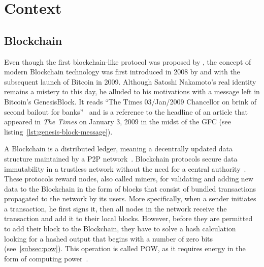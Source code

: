 \chapter{Context}\label{ch:context}

\section{Blockchain}\label{sec:blockchain}



Even though the first blockchain-like protocol was proposed by \textcite{chaum_computer_1982}, the concept of modern \gls{Blockchain} technology was first introduced in 2008 by \textcite{nakamoto_bitcoin_2008} and with the subsequent launch of Bitcoin in 2009.
Although Satoshi Nakamoto's real identity remains a mistery to this day, he alluded to his motivations with a message left in Bitcoin's \gls{GenesisBlock}.
It reads \enquote{The Times 03/Jan/2009 Chancellor on brink of second bailout for banks}~\autocite{nakamoto_bitcoin_2009} and is a reference to the headline of an article that appeared in \emph{The Times} on January 3, 2009 in the midst of the \gls{GFC} (see listing~\ref{lst:genesis-block-message}).


A \gls{Blockchain} is a distributed ledger, meaning a decentrally updated data structure maintained by a \gls{P2P} network~\autocites[3]{crosby_blockchain_2015}[1]{nakamoto_bitcoin_2008}.
\Gls{Blockchain} protocols secure data immutability in a trustless network without the need for a central authority~\autocites[3]{crosby_blockchain_2015}[4]{jafar_blockchain_2021}.
These protocols reward nodes, also called miners, for validating and adding new data to the \gls{Blockchain} in the form of blocks that consist of bundled transactions propagated to the network by its users.
More specifically, when a sender initiates a transaction, he first signs it, then all nodes in the network receive the transaction and add it to their local blocks.
However, before they are permitted to add their block to the \gls{Blockchain}, they have to solve a hash calculation looking for a hashed output that begins with a number of zero bits (see~\cref{subsec:pow}).
This operation is called \gls{POW}, as it requires energy in the form of computing power~\autocite[3]{nakamoto_bitcoin_2008}.

